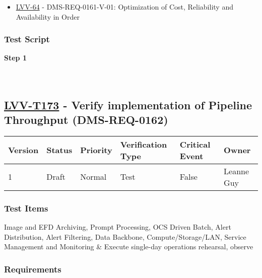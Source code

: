\begin{itemize}
\tightlist
\item
  \href{https://jira.lsstcorp.org/browse/LVV-64}{LVV-64} -
  DMS-REQ-0161-V-01: Optimization of Cost, Reliability and Availability
  in Order
\end{itemize}

\hypertarget{test-script-72}{%
\subsubsection{Test Script}\label{test-script-72}}

\textbf{Step 1}\\
~\\
~\\

\hypertarget{lvv-t173---verify-implementation-of-pipeline-throughput-dms-req-0162}{%
\subsection{\texorpdfstring{\href{https://jira.lsstcorp.org/secure/Tests.jspa\#/testCase/LVV-T173}{LVV-T173}
- Verify implementation of Pipeline Throughput
(DMS-REQ-0162)}{LVV-T173 - Verify implementation of Pipeline Throughput (DMS-REQ-0162)}}\label{lvv-t173---verify-implementation-of-pipeline-throughput-dms-req-0162}}

\begin{longtable}[]{@{}llllll@{}}
\toprule
Version & Status & Priority & Verification Type & Critical Event &
Owner\tabularnewline
\midrule
\endhead
1 & Draft & Normal & Test & False & Leanne Guy\tabularnewline
\bottomrule
\end{longtable}

\hypertarget{test-items-73}{%
\subsubsection{Test Items}\label{test-items-73}}

Image and EFD Archiving, Prompt Processing, OCS Driven Batch, Alert
Distribution, Alert Filtering, Data Backbone, Compute/Storage/LAN,
Service Management and Monitoring \& Execute single-day operations
rehearsal, observe

\hypertarget{requirements-73}{%
\subsubsection{Requirements}\label{requirements-73}}

